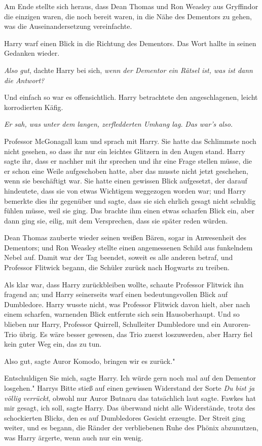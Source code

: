 Am Ende stellte sich heraus, dass Dean Thomas und Ron Weasley aus Gryffindor die
einzigen waren, die noch bereit waren, in die Nähe des Dementors zu gehen, was
die Auseinandersetzung vereinfachte.

Harry warf einen Blick in die Richtung des Dementors. Das Wort hallte in seinen
Gedanken wieder.

\emph{Also gut}, dachte Harry bei sich, \emph{wenn der Dementor ein Rätsel ist,
was ist dann die Antwort?}

Und einfach so war es offensichtlich. Harry betrachtete den angeschlagenen,
leicht korrodierten Käfig.

\emph{Er sah, was unter dem langen, zerfledderten Umhang lag.} \emph{Das war's
also.}

Professor McGonagall kam und sprach mit Harry. Sie hatte das Schlimmste noch
nicht gesehen, so dass ihr nur ein leichtes Glitzern in den Augen stand. Harry
sagte ihr, dass er nachher mit ihr sprechen und ihr eine Frage stellen müsse,
die er schon eine Weile aufgeschoben hatte, aber das musste nicht jetzt
geschehen, wenn sie beschäftigt war. Sie hatte einen gewissen Blick aufgesetzt,
der darauf hindeutete, dass sie von etwas Wichtigem weggezogen worden war; und
Harry bemerkte dies ihr gegenüber und sagte, dass sie sich ehrlich gesagt nicht
schuldig fühlen müsse, weil sie ging. Das brachte ihm einen etwas scharfen Blick
ein, aber dann ging sie, eilig, mit dem Versprechen, dass sie später reden
würden.

Dean Thomas zauberte wieder seinen weißen Bären, sogar in Anwesenheit des
Dementors; und Ron Weasley stellte einen angemessenen Schild aus funkelndem
Nebel auf. Damit war der Tag beendet, soweit es alle anderen betraf, und
Professor Flitwick begann, die Schüler zurück nach Hogwarts zu treiben.

Als klar war, dass Harry zurückbleiben wollte, schaute Professor Flitwick ihn
fragend an; und Harry seinerseits warf einen bedeutungsvollen Blick auf
Dumbledore. Harry wusste nicht, was Professor Flitwick davon hielt, aber nach
einem scharfen, warnenden Blick entfernte sich sein Hausoberhaupt. Und so
blieben nur Harry, Professor Quirrell, Schulleiter Dumbledore und ein
Auroren-Trio übrig. Es wäre besser gewesen, das Trio zuerst loszuwerden, aber
Harry fiel kein guter Weg ein, das zu tun.

\glqq{}Also gut\grqq{}, sagte Auror Komodo, \glqq{}bringen wir es zurück."

\glqq{}Entschuldigen Sie mich\grqq{}, sagte Harry. \glqq{}Ich würde gern noch mal
auf den Dementor losgehen." Harrys Bitte stieß auf einen gewissen Widerstand der
Sorte \glqq{}\emph{Du bist ja völlig verrückt}\grqq{}, obwohl nur Auror Butnaru
das tatsächlich laut sagte. \glqq{}Fawkes hat mir gesagt, ich soll\grqq{}, sagte
Harry. Das überwand nicht alle Widerstände, trotz des schockierten Blicks, den
es auf Dumbledores Gesicht erzeugte. Der Streit ging weiter, und es begann, die
Ränder der verbliebenen Ruhe des Phönix abzunutzen, was Harry ärgerte, wenn auch
nur ein wenig.

